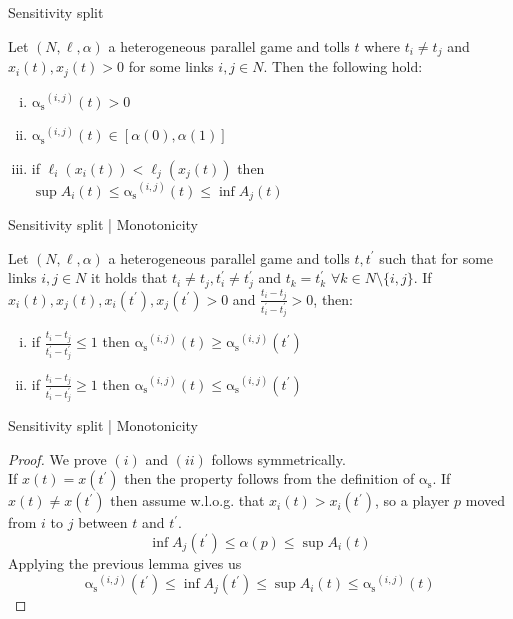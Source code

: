 \documentclass{beamer}
\newcommand{\as}{\mathrm{\alpha_s}}
\begin{document}
\begin{frame}{Sensitivity split}
	\begin{lemma}
		Let $(N, \ell, \alpha)$ a heterogeneous parallel game and tolls $t$ where $t_i \ne t_j$ and $x_i(t), x_j(t) > 0$ for some links $i, j \in N$.
		Then the following hold:
		\begin{enumerate}[(i)]
			\item $\as^{(i, j)}(t) > 0$
			\item $\as^{(i, j)}(t) \in [\alpha(0), \alpha(1)]$
			\item if $\ell_i(x_i(t)) < \ell_j(x_j(t))$ then
			$\sup A_i(t) \le \as^{(i, j)}(t) \le \inf A_j(t)$
		\end{enumerate}
	\end{lemma}
\end{frame}

\begin{frame}{Sensitivity split | Monotonicity}
	\begin{lemma}
		Let $(N, \ell, \alpha)$ a heterogeneous parallel game and tolls $t, t^\prime$ such that for some links $i, j \in N$ it holds that $t_i \ne t_j, t_i^\prime \ne t_j^\prime$ and $t_k = t_k^\prime$ $\forall k \in N \setminus \{i, j\}$.
		If $x_i(t), x_j(t), x_i(t^\prime), x_j(t^\prime) > 0$ and $\frac{t_i - t_j}{t_i^\prime - t_j^\prime} > 0$, then:
		\begin{enumerate}[(i)]
			\item if $\frac{t_i - t_j}{t_i^\prime - t_j^\prime} \le 1$ then $\as^{(i, j)}(t) \ge \as^{(i, j)}(t^\prime)$
			\item if $\frac{t_i - t_j}{t_i^\prime - t_j^\prime} \ge 1$ then $\as^{(i, j)}(t) \le \as^{(i, j)}(t^\prime)$
		\end{enumerate}
	\end{lemma}
\end{frame}

\begin{frame}{Sensitivity split | Monotonicity}
	\begin{proof}
		We prove $(i)$ and $(ii)$ follows symmetrically.\\
		If $x(t) = x(t^\prime)$ then the property follows from the definition of $\as$.
		If $x(t) \ne x(t^\prime)$ then assume w.l.o.g. that $x_i(t) > x_i(t^\prime)$, so a player $p$ moved from $i$ to $j$ between $t$ and $t^\prime$.
		\[\inf A_j(t^\prime) \le \alpha(p) \le \sup A_i(t)\]
		Applying the previous lemma gives us
		\[\as^{(i, j)}(t^\prime) \le \inf A_j(t^\prime) \le \sup A_i(t) \le \as^{(i, j)}(t)\]
	\end{proof}
\end{frame}
\end{document}
